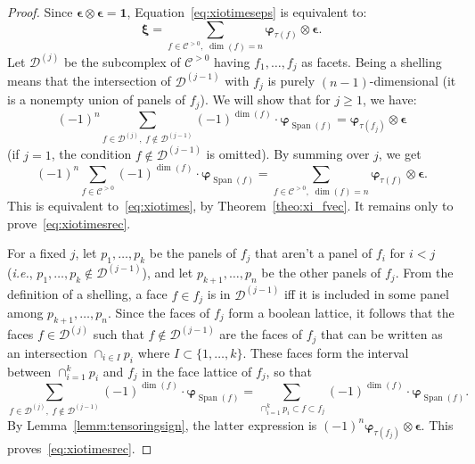 \documentclass[11pt]{article}
\theoremstyle{definition}
\DeclareMathOperator{\Span}{Span}
\newcommand{\bphi}{\boldsymbol{\varphi}}
\newcommand{\bxi}{\boldsymbol{\xi}}
\newcommand{\bepsilon}{\boldsymbol{\epsilon}}
\newcommand{\triv}{\mathbf{1}}
\newcommand{\DD}{\mathcal{D}}
\newcommand{\CCP}{\mathcal{C}^{>0}}
\begin{document}
\begin{proof}
    Since $\bepsilon \otimes \bepsilon = \triv$, Equation~\eqref{eq:xiotimeseps} is equivalent to:
    \begin{equation} \label{eq:xiotimes}
        \bxi  
            =
        \sum_{ f \in \CCP,\; \dim(f)=n }  \bphi_{\tau(f)} \otimes \bepsilon.
    \end{equation}
    Let $\DD^{(j)}$ be the subcomplex of $\CCP$ having $f_1,\dots,f_j$ as facets.  Being a shelling means that the intersection of $\DD^{(j-1)}$ with $f_j$ is purely $(n-1)$-dimensional (it is a nonempty union of panels of $f_j$).  We will show that for $j\geq 1$, we have:
    \begin{equation} \label{eq:xiotimesrec}
        (-1)^n \sum_{f \in \DD^{(j)},\; f \notin \DD^{(j-1)}} (-1)^{\dim(f)} \cdot \bphi_{\Span(f)}
            =
        \bphi_{\tau(f_j)} \otimes \bepsilon
    \end{equation}
    (if $j=1$, the condition $f \notin \DD^{(j-1)}$ is omitted).  By summing over $j$, we get
    \begin{equation}
        (-1)^n \sum_{f \in \CCP} (-1)^{\dim(f)} \cdot \bphi_{\Span(f)}
        =
        \sum_{ f \in \CCP,\; \dim(f)=n }  \bphi_{\tau(f)} \otimes \bepsilon.
    \end{equation}
    This is equivalent to~\eqref{eq:xiotimes}, by Theorem~\ref{theo:xi_fvec}.  It remains only to prove~\eqref{eq:xiotimesrec}.
    
    For a fixed $j$, let $p_1,\dots,p_k$ be the panels of $f_j$ that aren't a panel of $f_i$ for $i<j$ ({\it i.e.}, $p_1,\dots,p_k \notin \mathcal{D}^{(j-1)}$), and let $p_{k+1},\dots,p_n$ be the other panels of $f_j$.  From the definition of a shelling, a face $f \in f_j$ is in $\mathcal{D}^{(j-1)}$ iff it is included in some panel among $p_{k+1},\dots,p_n$.  Since the faces of $f_j$ form a boolean lattice, it follows that the faces $f \in \DD^{(j)}$ such that $f \notin \DD^{(j-1)}$ are the faces of $f_j$ that can be written as an intersection $\cap_{i\in I} p_i$ where $I \subset \{1,\dots,k\}$.  These faces form the interval between $\cap_{i=1}^k p_i$ and $f_j$ in the face lattice of $f_j$, so that
    \begin{equation} \label{eq:xiotimesrec2}
        \sum_{f \in \DD^{(j)},\; f \notin \DD^{(j-1)}} (-1)^{\dim(f)} \cdot \bphi_{\Span(f)}
            =
        \sum_{ \cap_{i=1}^k p_i \subset f \subset f_j } (-1)^{\dim(f)} \cdot \bphi_{\Span(f)}.
    \end{equation}
    By Lemma~\ref{lemm:tensoringsign}, the latter expression is $ (-1)^n \bphi_{\tau(f_j)} \otimes \bepsilon$.  This proves~\eqref{eq:xiotimesrec}.
\end{proof}
\end{document}
